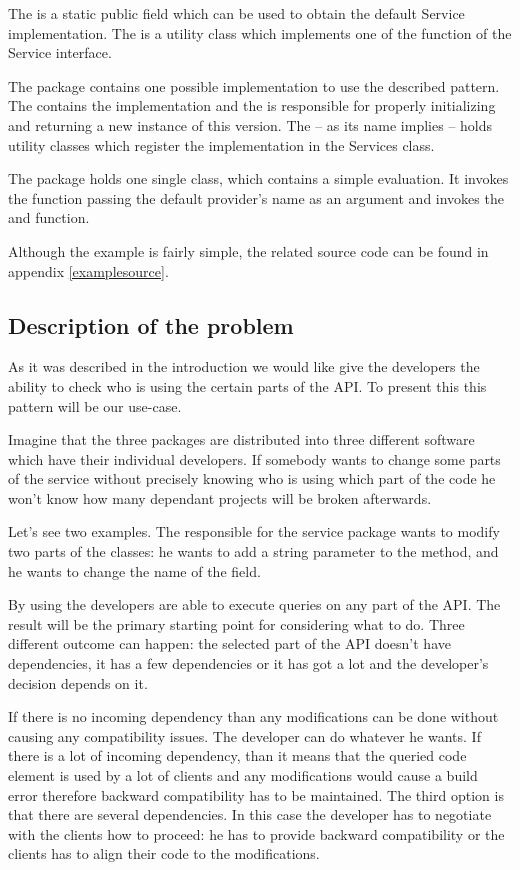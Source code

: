 The  is a static public field which can be used to
obtain the default Service implementation. The  is a
utility class which implements one of the function of the Service interface.

The  package contains one possible implementation to use the
described pattern. The  contains the implementation and the
 is responsible for properly initializing and returning a
new instance of this version. The  -- as its name implies --
holds utility classes which register the implementation in the Services class.

The  package holds one single  class, which contains a
simple evaluation. It invokes the  function passing
the default provider's name as an argument and invokes the  and
 function.

Although the example is fairly simple, the related source code can be found in
appendix \autoref{examplesource}.

\subsection{Description of the problem}
As it was described in the introduction we would like give the developers the
ability to check who is using the certain parts of the API. To present this this
pattern will be our use-case.

Imagine that the three packages are distributed into three different software
which have their individual developers. If somebody wants to change some parts
of the service without precisely knowing who is using which part of the code he
won't know how many dependant projects will be broken afterwards.

Let's see two examples. The responsible for the service package wants to modify
two parts of the classes: he wants to add a string parameter to the
 method, and he wants to change the name of the
 field. 

By using \ptool{} the developers are able to execute queries on any part of the
API. The result will be the primary starting point for considering what to do.
Three different outcome can happen: the selected part of the API doesn't have
dependencies, it has a few dependencies or it has got a lot and the developer's
decision depends on it. 

If there is no incoming dependency than any modifications can be done without
causing any compatibility issues. The developer can do whatever he wants.
If there is a lot of incoming dependency, than it means that the queried code
element is used by a lot of clients and any modifications would cause a build
error therefore backward compatibility has to be maintained. The third option is
that there are several dependencies. In this case the developer has to negotiate
with the clients how to proceed: he has to provide backward compatibility or the
clients has to align their code to the modifications.


